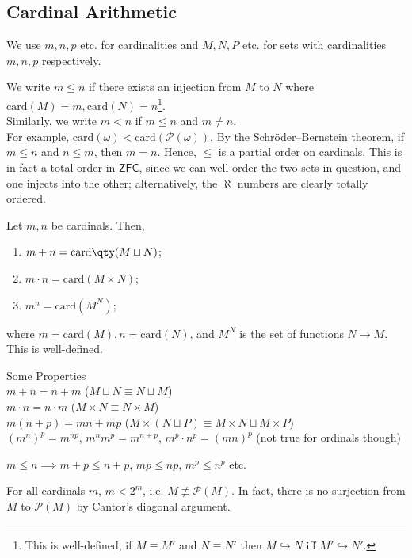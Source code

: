 \subsection{Cardinal Arithmetic}
We use $m, n, p$ etc. for cardinalities and $M, N, P$ etc. for sets with cardinalities $m, n, p$ respectively.

We write $m \leq n$ if there exists an injection from $M$ to $N$ where $\mathrm{card}(M) = m, \mathrm{card}(N) = n$\footnote{This is well-defined, if $M \equiv M'$ and $N \equiv N'$ then $M \hookrightarrow N$ iff $M' \hookrightarrow N'$.}. \\
Similarly, we write $m < n$ if $m \leq n$ and $m \neq n$. \\
For example, $\mathrm{card}(\omega) < \mathrm{card}(\mathcal P(\omega))$.
By the Schr\"oder--Bernstein theorem, if $m \leq n$ and $n \leq m$, then $m = n$.
Hence, $\leq$ is a partial order on cardinals.
This is in fact a total order in $\mathsf{ZFC}$, since we can well-order the two sets in question, and one injects into the other; alternatively, the $\aleph$ numbers are clearly totally ordered.

Let $m, n$ be cardinals.
Then,
\begin{enumerate}
    \item $m + n = \mathrm{card}\qty(M \sqcup N)$;
    \item $m \cdot n = \mathrm{card}(M \times N)$;
    \item $m^n = \mathrm{card}(M^N)$;
\end{enumerate}
where $m = \mathrm{card}(M), n = \mathrm{card}(N)$, and $M^N$ is the set of functions $N \to M$.
This is well-defined.

\underline{Some Properties} \\
$m + n = n + m$ ($M \sqcup N \equiv N \sqcup M$) \\
$m \cdot n = n \cdot m$ ($M \times N \equiv N \times M$) \\
$m (n + p) = mn + mp$ ($M \times (N \sqcup P) \equiv M \times N \sqcup M \times P$) \\
$(m^n)^p = m^{np}$, $m^n m^p = m^{n + p}$, $m^p \cdot n^p = (mn)^p$ (not true for ordinals though)

$m \leq n \implies m + p \leq n + p$, $mp \leq np$, $m^p \leq n^p$ etc.

\begin{note}
    For all cardinals $m$, $m < 2^m$, i.e. $M \not\equiv \mathcal{P}(M)$.
    In fact, there is no surjection from $M$ to $\mathcal{P}(M)$ by Cantor's diagonal argument.
\end{note}


